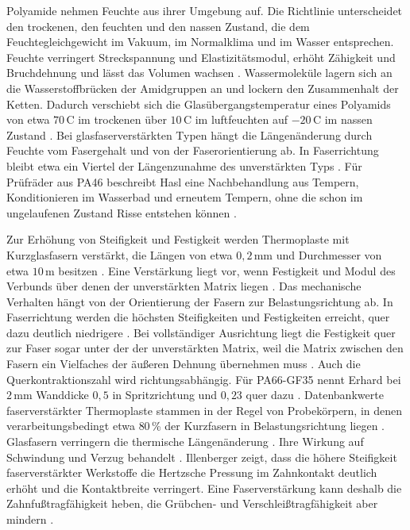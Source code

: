 Polyamide nehmen Feuchte aus ihrer Umgebung auf. Die Richtlinie unterscheidet den trockenen, den feuchten und den nassen Zustand, die dem Feuchtegleichgewicht im Vakuum, im Normalklima und im Wasser entsprechen. Feuchte verringert Streckspannung und Elastizitätsmodul, erhöht Zähigkeit und Bruchdehnung und lässt das Volumen wachsen \cite[S.~7 bis 8]{VDI2736-1}. Wassermoleküle lagern sich an die Wasserstoffbrücken der Amidgruppen an und lockern den Zusammenhalt der Ketten. Dadurch verschiebt sich die Glasübergangstemperatur eines Polyamids von etwa $70$\,\textdegree C im trockenen über $10$\,\textdegree C im luftfeuchten auf $-20$\,\textdegree C im nassen Zustand \cite[S.~45]{Erh08}. Bei glasfaserverstärkten Typen hängt die Längenänderung durch Feuchte vom Fasergehalt und von der Faserorientierung ab. In Faserrichtung bleibt etwa ein Viertel der Längenzunahme des unverstärkten Typs \cite[S.~45]{Erh08}. Für Prüfräder aus PA46 beschreibt Hasl eine Nachbehandlung aus Tempern, Konditionieren im Wasserbad und erneutem Tempern, ohne die schon im ungelaufenen Zustand Risse entstehen können \cite[S.~66 bis 67]{Has18}.

Zur Erhöhung von Steifigkeit und Festigkeit werden Thermoplaste mit Kurzglasfasern verstärkt, die Längen von etwa $0{,}2$\,mm und Durchmesser von etwa $10$\,\textmu m besitzen \cite[S.~55]{Erh08}. Eine Verstärkung liegt vor, wenn Festigkeit und Modul des Verbunds über denen der unverstärkten Matrix liegen \cite[S.~55]{Erh08}. Das mechanische Verhalten hängt von der Orientierung der Fasern zur Belastungsrichtung ab. In Faserrichtung werden die höchsten Steifigkeiten und Festigkeiten erreicht, quer dazu deutlich niedrigere \cite[S.~39]{Sto18}. Bei vollständiger Ausrichtung liegt die Festigkeit quer zur Faser sogar unter der der unverstärkten Matrix, weil die Matrix zwischen den Fasern ein Vielfaches der äußeren Dehnung übernehmen muss \cite[S.~66 bis 68]{Erh08}. Auch die Querkontraktionszahl wird richtungsabhängig. Für PA66-GF35 nennt Erhard bei $2$\,mm Wanddicke $0{,}5$ in Spritzrichtung und $0{,}23$ quer dazu \cite[S.~136]{Erh08}. Datenbankwerte faserverstärkter Thermoplaste stammen in der Regel von Probekörpern, in denen verarbeitungsbedingt etwa $80$\,\% der Kurzfasern in Belastungsrichtung liegen \cite[S.~39]{Sto18}. Glasfasern verringern die thermische Längenänderung \cite[S.~9]{VDI2736-1}. Ihre Wirkung auf Schwindung und Verzug behandelt . Illenberger zeigt, dass die höhere Steifigkeit faserverstärkter Werkstoffe die Hertzsche Pressung im Zahnkontakt deutlich erhöht und die Kontaktbreite verringert. Eine Faserverstärkung kann deshalb die Zahnfußtragfähigkeit heben, die Grübchen- und Verschleißtragfähigkeit aber mindern \cite[S.~30]{Ill22}.

